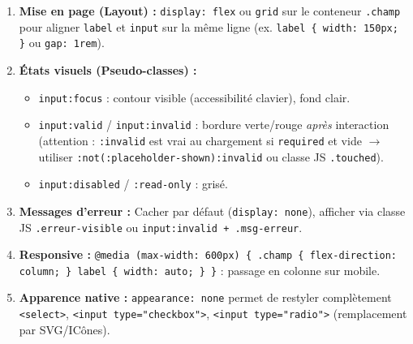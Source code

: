 \documentclass[11pt]{article}
\begin{document}
\begin{aretenir}
\begin{enumerate}
    \item \textbf{Mise en page (Layout) :} \texttt{display: flex} ou \texttt{grid} sur le conteneur \texttt{.champ} pour aligner \texttt{label} et \texttt{input} sur la même ligne (ex. \texttt{label \{ width: 150px; \}} ou \texttt{gap: 1rem}).
    \item \textbf{États visuels (Pseudo-classes) :}
    \begin{itemize}
        \item \texttt{input:focus} : contour visible (accessibilité clavier), fond clair.
        \item \texttt{input:valid} / \texttt{input:invalid} : bordure verte/rouge \emph{après} interaction (attention : \texttt{:invalid} est vrai au chargement si \texttt{required} et vide $\rightarrow$ utiliser \texttt{:not(:placeholder-shown):invalid} ou classe JS \texttt{.touched}).
        \item \texttt{input:disabled} / \texttt{:read-only} : grisé.
    \end{itemize}
    \item \textbf{Messages d'erreur :} Cacher par défaut (\texttt{display: none}), afficher via classe JS \texttt{.erreur-visible} ou \texttt{input:invalid + .msg-erreur}.
    \item \textbf{Responsive :} \texttt{@media (max-width: 600px) \{ .champ \{ flex-direction: column; \} label \{ width: auto; \} \}} : passage en colonne sur mobile.
    \item \textbf{Apparence native :} \texttt{appearance: none} permet de restyler complètement \texttt{<select>}, \texttt{<input type="checkbox">}, \texttt{<input type="radio">} (remplacement par SVG/ICônes).
\end{enumerate}
\end{aretenir}
\end{document}
